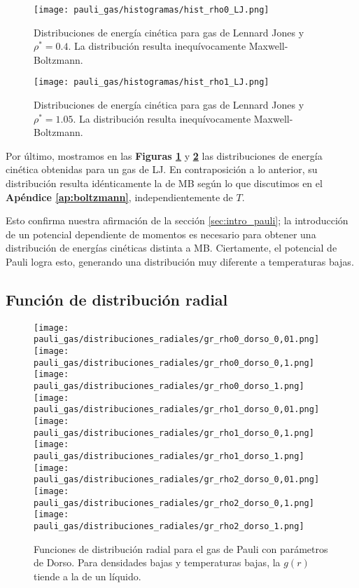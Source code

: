 \begin{figure}[H]
	\centering
	\texttt{[image: pauli\_gas/histogramas/hist\_rho0\_LJ.png]}
	\caption{Distribuciones de energía cinética para gas de Lennard Jones y $\rho^* = 0.4$.
		La distribución resulta inequívocamente Maxwell-Boltzmann.}
	\label{fig:hist_rho0_LJ}
\end{figure}
\begin{figure}[H]
	\centering
	\texttt{[image: pauli\_gas/histogramas/hist\_rho1\_LJ.png]}
	\caption{Distribuciones de energía cinética para gas de Lennard Jones y $\rho^* = 1.05$.
		La distribución resulta inequívocamente Maxwell-Boltzmann.}
	\label{fig:hist_rho1_LJ}
\end{figure}

Por último, mostramos en las \textbf{Figuras \ref{fig:hist_rho0_LJ}} y \textbf{\ref{fig:hist_rho1_LJ}} las distribuciones de energía cinética obtenidas para un gas de LJ.
En contraposición a lo anterior, su distribución resulta idénticamente la de MB según lo que discutimos en el \textbf{Apéndice \ref{ap:boltzmann}}, independientemente de $T$.

Esto confirma nuestra afirmación de la sección \ref{sec:intro_pauli}; la introducción de un potencial dependiente de momentos es necesario para obtener una distribución de
energías cinéticas distinta a MB.
Ciertamente, el potencial de Pauli logra esto, generando una distribución muy diferente a temperaturas bajas.


\subsection{Función de distribución radial}{\label{sec:gr_pauli_gas}}

\begin{figure}[H]
	\centering	%
	\texttt{[image: pauli\_gas/distribuciones\_radiales/gr\_rho0\_dorso\_0,01.png]}
	\texttt{[image: pauli\_gas/distribuciones\_radiales/gr\_rho0\_dorso\_0,1.png]}
	\texttt{[image: pauli\_gas/distribuciones\_radiales/gr\_rho0\_dorso\_1.png]}
	\texttt{[image: pauli\_gas/distribuciones\_radiales/gr\_rho1\_dorso\_0,01.png]}
	\texttt{[image: pauli\_gas/distribuciones\_radiales/gr\_rho1\_dorso\_0,1.png]}
	\texttt{[image: pauli\_gas/distribuciones\_radiales/gr\_rho1\_dorso\_1.png]}
	\texttt{[image: pauli\_gas/distribuciones\_radiales/gr\_rho2\_dorso\_0,01.png]}
	\texttt{[image: pauli\_gas/distribuciones\_radiales/gr\_rho2\_dorso\_0,1.png]}
	\texttt{[image: pauli\_gas/distribuciones\_radiales/gr\_rho2\_dorso\_1.png]}
	\caption{Funciones de distribución radial para el gas de Pauli con parámetros de Dorso.
		Para densidades bajas y temperaturas bajas, la $g(r)$ tiende a la de un líquido.}
	\label{fig:gr_dorso}
\end{figure}

